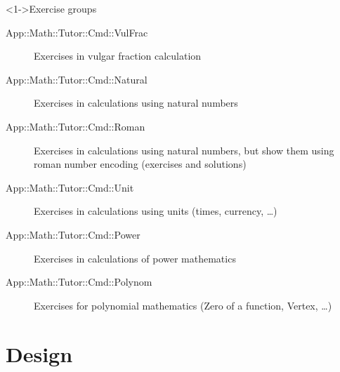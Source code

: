 \documentclass[ngerman,xcolor={table,dvipsnames},scriptsizeer,compress,hyperref={bookmarks,colorlinks}]{beamer}
\begin{document}
\begin{frame}[fragile]

\begin{block}<1->{Exercise groups}
\begin{description}
\item[App::Math::Tutor::Cmd::VulFrac] Exercises in vulgar fraction calculation
\item[App::Math::Tutor::Cmd::Natural] Exercises in calculations using natural numbers
\item[App::Math::Tutor::Cmd::Roman] Exercises in calculations using natural numbers, but show them using roman number encoding (exercises and solutions)
\item[App::Math::Tutor::Cmd::Unit] Exercises in calculations using units (times, currency, \ldots)
\item[App::Math::Tutor::Cmd::Power] Exercises in calculations of power mathematics
\item[App::Math::Tutor::Cmd::Polynom] Exercises for polynomial mathematics (Zero of a function, Vertex, \ldots)
\end{description}
\end{block}

\end{frame}

\section{Design}
\end{document}
